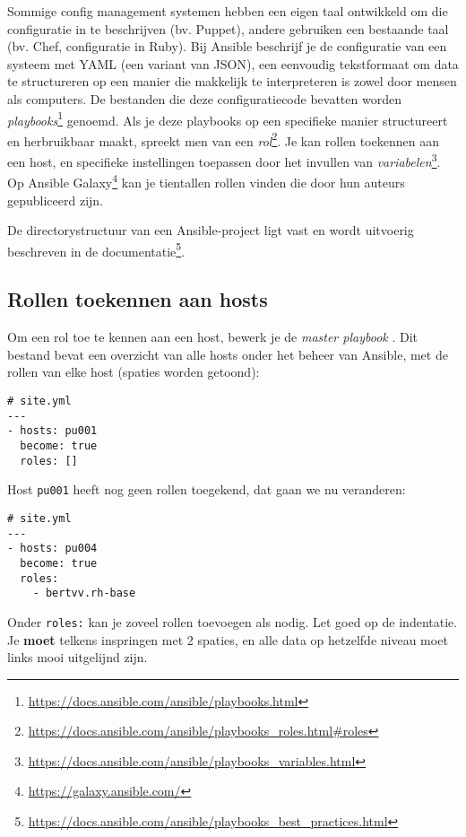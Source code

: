 Sommige config management systemen hebben een eigen taal ontwikkeld om die configuratie in te beschrijven (bv. Puppet), andere gebruiken een bestaande taal (bv. Chef, configuratie in Ruby). Bij Ansible beschrijf je de configuratie van een systeem met YAML (een variant van JSON), een eenvoudig tekstformaat om data te structureren op een manier die makkelijk te interpreteren is zowel door mensen als computers. De bestanden die deze configuratiecode bevatten worden \emph{playbooks}\footnote{\url{https://docs.ansible.com/ansible/playbooks.html}} genoemd. Als je deze playbooks op een specifieke manier structureert en herbruikbaar maakt, spreekt men van een \emph{rol}\footnote{\url{https://docs.ansible.com/ansible/playbooks_roles.html\#roles}}. Je kan rollen toekennen aan een host, en specifieke instellingen toepassen door het invullen van \emph{variabelen}\footnote{\url{https://docs.ansible.com/ansible/playbooks_variables.html}}. Op Ansible Galaxy\footnote{\url{https://galaxy.ansible.com/}} kan je tientallen rollen vinden die door hun auteurs gepubliceerd zijn.

De directorystructuur van een Ansible-project ligt vast en wordt uitvoerig beschreven in de documentatie\footnote{\url{https://docs.ansible.com/ansible/playbooks_best_practices.html}}.

\subsection{Rollen toekennen aan hosts}%
\label{sub:rollen-toekennen-aan-hosts}

Om een rol toe te kennen aan een host, bewerk je de \emph{master playbook} . Dit bestand bevat een overzicht van alle hosts onder het beheer van Ansible, met de rollen van elke host (spaties worden getoond):

\begin{verbatim}
# site.yml
---
- hosts: pu001
  become: true
  roles: []
\end{verbatim}

Host \texttt{pu001} heeft nog geen rollen toegekend, dat gaan we nu veranderen:

\begin{verbatim}
# site.yml
---
- hosts: pu004
  become: true
  roles:
    - bertvv.rh-base
\end{verbatim}

Onder \texttt{roles:} kan je zoveel rollen toevoegen als nodig. Let goed op de indentatie. Je \textbf{moet} telkens inspringen met 2 spaties, en alle data op hetzelfde niveau moet links mooi uitgelijnd zijn.

